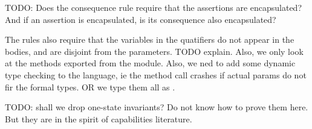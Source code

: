 TODO: Does the consequence rule require that the assertions are encapsulated? And if an assertion is encapsulated, is its consequence also encapsulated?

The rules also require that the variables in the quatifiers do not appear in the bodies, and are disjoint from the parameters.
TODO explain. Also, we only look at the methods exported from the module.  Also, we ned to add some dynamic type checking to the language, ie the method call crashes if actual params do not fir the formal types. OR we type them all as .

TODO: shall we drop one-state invariants? Do not know how to prove them here. But they are in the spirit of capabilities literature.

%
% 
%
%
%
%
%

